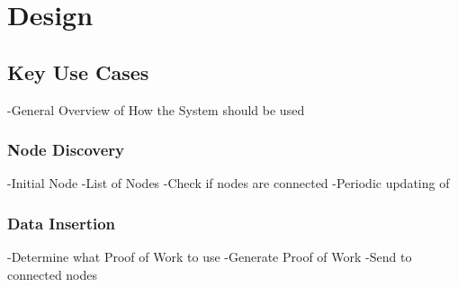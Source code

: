 \section{Design}
	\subsection{Key Use Cases}
		-General Overview of How the System should be used
		\subsubsection*{Node Discovery}
			-Initial Node
			-List of Nodes
			-Check if nodes are connected
			-Periodic updating of 
		\subsubsection*{Data Insertion}
			-Determine what Proof of Work to use
			-Generate Proof of Work
			-Send to connected nodes
